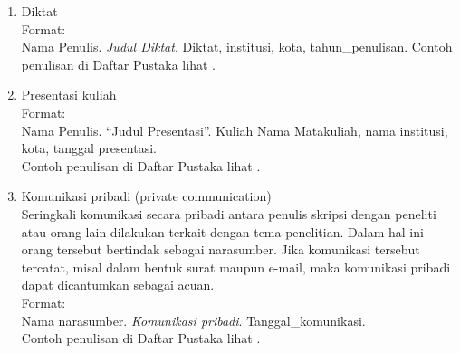 \begin{enumerate}[label=\alph*)]
\begin{enumerate}[label=\roman*)]
\item Diktat \\
Format: \\
Nama Penulis. \textit{Judul Diktat}. Diktat, institusi, kota, tahun\_penulisan.
Contoh penulisan di Daftar Pustaka lihat \cite{diktat}. 

\item Presentasi kuliah \\
Format: \\
Nama Penulis. ``Judul Presentasi''. Kuliah Nama Matakuliah, nama institusi, kota,
tanggal presentasi. \\
Contoh penulisan di Daftar Pustaka lihat \cite{presentasi}. 

\item Komunikasi pribadi (private communication)\\
Seringkali komunikasi secara pribadi antara penulis skripsi dengan peneliti atau
orang lain dilakukan terkait dengan tema penelitian. Dalam hal ini orang tersebut
bertindak sebagai narasumber. Jika komunikasi tersebut tercatat, misal dalam
bentuk surat maupun e-mail, maka komunikasi pribadi dapat dicantumkan sebagai
acuan. \\
Format: \\
Nama narasumber. \textit{Komunikasi pribadi}. Tanggal\_komunikasi.\\
Contoh penulisan di Daftar Pustaka lihat \cite{komprivat}. 

\end{enumerate}

\end{enumerate}




